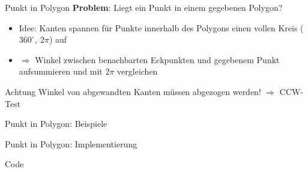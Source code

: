 \begin{frame}{Punkt in Polygon}
	\textbf{Problem}: Liegt ein Punkt in einem gegebenen Polygon?
	\begin{itemize}
		\item Idee: Kanten spannen für Punkte innerhalb des Polygons einen vollen Kreis ($360^\circ,\ 2\pi$) auf
		\item $\Rightarrow$ Winkel zwischen benachbarten Eckpunkten und gegebenem Punkt aufsummieren und mit $2\pi$ vergleichen
	\end{itemize}
	\begin{alertblock}{Achtung}
		Winkel von abgewandten Kanten müssen abgezogen werden! $\Rightarrow$ CCW-Test
	\end{alertblock}
\end{frame}

\begin{frame}{Punkt in Polygon: Beispiele}
\end{frame}

\begin{frame}{Punkt in Polygon: Implementierung}
	\begin{exampleblock}{Code}
		\lstset{
			language=C++,
			tabsize=2
		}
		
	\end{exampleblock}
\end{frame}
